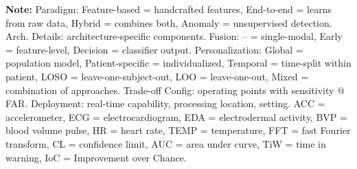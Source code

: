 \begin{landscape}
\begin{table}[htbp]
\textbf{Note:} Paradigm: Feature-based = handcrafted features, End-to-end = learns from raw data, Hybrid = combines both, Anomaly = unsupervised detection. Arch. Details: architecture-specific components. Fusion: -- = single-modal, Early = feature-level, Decision = classifier output. Personalization: Global = population model, Patient-specific = individualized, Temporal = time-split within patient, LOSO = leave-one-subject-out, LOO = leave-one-out, Mixed = combination of approaches. Trade-off Config: operating points with sensitivity @ FAR. Deployment: real-time capability, processing location, setting. ACC = accelerometer, ECG = electrocardiogram, EDA = electrodermal activity, BVP = blood volume pulse, HR = heart rate, TEMP = temperature, FFT = fast Fourier transform, CL = confidence limit, AUC = area under curve, TiW = time in warning, IoC = Improvement over Chance.
\end{table}
\end{landscape}
